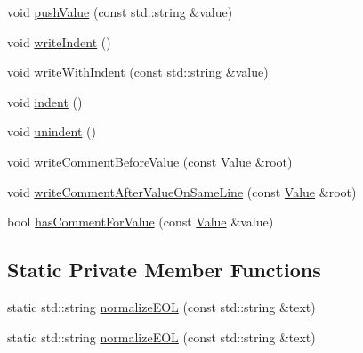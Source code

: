 \begin{DoxyCompactItemize}
\item 
void \hyperlink{classJson_1_1StyledStreamWriter_ae626a0ab8a529e0e524924f1ab3b1a0d}{push\-Value} (const std\-::string \&value)
\item 
void \hyperlink{classJson_1_1StyledStreamWriter_a5a52fa5b406f1580a61dde3b5638e76d}{write\-Indent} ()
\item 
void \hyperlink{classJson_1_1StyledStreamWriter_a602fd51aa92cac1f18351806f1d9c8cc}{write\-With\-Indent} (const std\-::string \&value)
\item 
void \hyperlink{classJson_1_1StyledStreamWriter_ab49409578422aa73b060e3492dd6c72a}{indent} ()
\item 
void \hyperlink{classJson_1_1StyledStreamWriter_a74d8fb9beecd29759d7b79f430386358}{unindent} ()
\item 
void \hyperlink{classJson_1_1StyledStreamWriter_a79c3c2b320475035c47b2db484a3e434}{write\-Comment\-Before\-Value} (const \hyperlink{classJson_1_1Value}{Value} \&root)
\item 
void \hyperlink{classJson_1_1StyledStreamWriter_ad2ca860e317ca91d6b2932535b4ce9c7}{write\-Comment\-After\-Value\-On\-Same\-Line} (const \hyperlink{classJson_1_1Value}{Value} \&root)
\item 
bool \hyperlink{classJson_1_1StyledStreamWriter_ad2892f57171919fa4f8a5ae5574755cf}{has\-Comment\-For\-Value} (const \hyperlink{classJson_1_1Value}{Value} \&value)
\end{DoxyCompactItemize}
\subsection*{Static Private Member Functions}
\begin{DoxyCompactItemize}
\item 
static std\-::string \hyperlink{classJson_1_1StyledStreamWriter_a244d3addb28d21a77dd7369097ef113d}{normalize\-E\-O\-L} (const std\-::string \&text)
\item 
static std\-::string \hyperlink{classJson_1_1StyledStreamWriter_a244d3addb28d21a77dd7369097ef113d}{normalize\-E\-O\-L} (const std\-::string \&text)
\end{DoxyCompactItemize}
